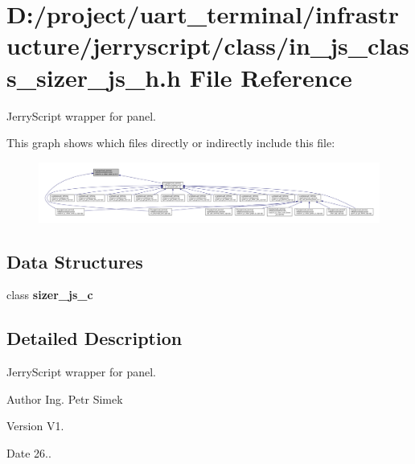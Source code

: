 \section{D\+:/project/uart\+\_\+terminal/infrastructure/jerryscript/class/in\+\_\+js\+\_\+class\+\_\+sizer\+\_\+js\+\_\+h.h File Reference}
\label{in__js__class__sizer__js__h_8h}


Jerry\+Script wrapper for panel.  


This graph shows which files directly or indirectly include this file\+:\nopagebreak
\begin{figure}[H]
\begin{center}
\leavevmode
\includegraphics[width=350pt]{in__js__class__sizer__js__h_8h__dep__incl}
\end{center}
\end{figure}
\subsection*{Data Structures}
\begin{DoxyCompactItemize}
\item 
class \textbf{ sizer\+\_\+js\+\_\+c}
\end{DoxyCompactItemize}


\subsection{Detailed Description}
Jerry\+Script wrapper for panel. 

\begin{DoxyAuthor}{Author}
Ing. Petr Simek 
\end{DoxyAuthor}
\begin{DoxyVersion}{Version}
V1. 
\end{DoxyVersion}
\begin{DoxyDate}{Date}
26.. 
\end{DoxyDate}
